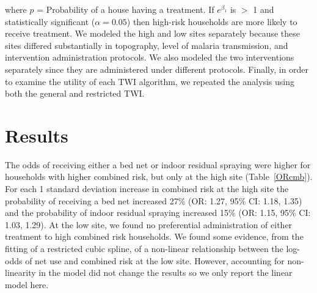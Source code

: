 \documentclass[10pt,letterpaper]{article}\usepackage[]{graphicx}\usepackage[]{color}
\begin{document}
where $p$  =  Probability of a house having a treatment.  If $e^{\beta_1}$ is $>$ 1 and statistically significant ($\alpha = 0.05$) then high-risk households are more likely to receive treatment.  %
We modeled the high and low sites separately because these sites differed substantially in topography, level of malaria transmission, and intervention administration protocols.  We also modeled the two interventions separately since they are administered under different protocols.  Finally, in order to examine the utility of each TWI algorithm, we repeated the analysis using both the general and restricted TWI.\\  %




























\section*{Results}
The odds of receiving either a bed net or indoor residual spraying were higher for households with higher combined risk,  but only at the high site (Table~\ref{ORcmb}).  For each 1 standard deviation increase in combined risk at the high site the probability of receiving a bed net increased 27\% (OR: 1.27,  95\% CI: 1.18,  1.35) and the probability of indoor residual spraying increased 15\% (OR: 1.15,  95\% CI: 1.03,  1.29).  At the low site,  we found no preferential administration of either treatment to high combined risk households.  We found some evidence,  from the fitting of a restricted cubic spline,  of a non-linear relationship between the log-odds of net use and combined risk at the low site.  However,  accounting for non-linearity in the model did not change the results so we only report the linear model here.\\ 
\end{document}
